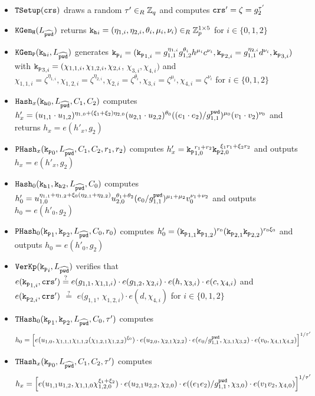 \begin{itemize}
	\item $\mathtt{TSetup}(\mathtt{crs})$ draws a random $\tau'\in_R\mathbb{Z}_q$ and computes $\mathtt{crs}'=\zeta=g_2^{\tau'}$
	
	\item $\mathtt{KGen_H}(L_{\widehat{\mathtt{pwd}}})$ returns $\mathtt{k_h}_i=(\eta_{1,i},\eta_{2,i},\theta_i,\mu_i,\nu_i)\in_R\mathbb{Z}_p^{1\times 5}$ for $i\in\{0,1,2\}$
	
  \item $\mathtt{KGen_P}(\mathtt{k_h}_i, L_{\widehat{\mathtt{pwd}}})$ generates 
      $\mathtt{k_p}_i=(\mathtt{k_p}_{1,i}=g_{1,1}^{\eta_{1,i}} g_{1,2}^{\theta_i} h^{\mu_i} c^{\nu_i}, \mathtt{k_p}_{2,i}=g_{1,1}^{\eta_{2,i}} d^{\nu_i}, \mathtt{k_p}_{3,i})$ with
      $\mathtt{k_p}_{3,i}=(\chi_{1,1,i}, \chi_{1,2,i}, \chi_{2,i}$, $\chi_{3,i}, \chi_{4,i})$ and 
      $\chi_{1,1,i}={\zeta}^{\eta_{1,i}}, \chi_{1,2,i}={\zeta}^{\eta_{2,i}}, \chi_{2,i}={\zeta}^{\theta_i}, \chi_{3,i}={\zeta}^{\mu_i}, \chi_{4,i}={\zeta}^{\nu_i}$ for $i\in\{0,1,2\}$
  
  \item $\mathtt{Hash}_x(\mathtt{k_h}_0, L_{\widehat{\mathtt{pwd}}}, C_1, C_2)$ computes 
      $h'_x=(u_{1,1}\cdot u_{1,2})^{\eta_{1,0}+(\xi_1+\xi_2)\eta_{2,0}} (u_{2,1}\cdot u_{2,2})^{\theta_0} ((e_1\cdot e_2)/g_{1,1}^{\mathtt{pwd}})^{\mu_0} (v_1\cdot v_2)^{\nu_0}$
      and returns $h_x=e(h'_x,g_2)$
  \item $\mathtt{PHash}_x(\mathtt{k_p}_0, L_{\widehat{\mathtt{pwd}}}, C_1, C_2, r_1, r_2)$ computes 
      $h'_x=\mathtt{k_p}_{1,0}^{r_1+r_2} \mathtt{k_p}_{2,0}^{\xi_1 r_1+\xi_2 r_2}$
      and outputs $h_x=e(h'_x,g_2)$
  \item $\mathtt{Hash}_0(\mathtt{k_h}_1, \mathtt{k_h}_2, L_{\widehat{\mathtt{pwd}}}, C_0)$ computes 
      $h'_0=u_{1,0}^{\eta_{1,1}+\eta_{1,2}+\xi_0(\eta_{2,1}+\eta_{2,2})} u_{2,0}^{\theta_1+\theta_2} (e_0/g_{1,1}^{\mathtt{pwd}})^{\mu_1+\mu_2} v_0^{\nu_1+\nu_2}$
      and outputs $h_0=e(h'_0,g_2)$
  \item $\mathtt{PHash}_0(\mathtt{k_p}_1, \mathtt{k_p}_2, L_{\widehat{\mathtt{pwd}}}, C_0, r_0)$ computes $h'_0=(\mathtt{k_p}_{1,1}\mathtt{k_p}_{1,2})^{r_0} (\mathtt{k_p}_{2,1}\mathtt{k_p}_{2,2})^{r_0\xi_0}$
      and outputs $h_0=e(h'_0,g_2)$
	
  \item $\mathtt{VerKp}(\mathtt{k_p}_i, L_{\widehat{\mathtt{pwd}}})$ verifies that 
      $e(\mathtt{k_p}_{1,i}, \mathtt{crs}')\stackrel{?}{=} e(g_{1,1}, \chi_{1,1,i})\cdot e(g_{1,2}, \chi_{2,i})\cdot e(h, \chi_{3,i})\cdot e(c, \chi_{4,i})$ and
      $e(\mathtt{k_p}_{2,i}, \mathtt{crs}')$ $\stackrel{?}{=}$ $e(g_{1,1}$, $\chi_{1,2,i})\cdot e(d, \chi_{4,i})$ for $i\in\{0,1,2\}$

  \item $\mathtt{THash}_0(\mathtt{k_p}_1, \mathtt{k_p}_2, L_{\widehat{\mathtt{pwd}}}, C_0, \tau')$ computes 
      \[h_0=\left[ e(u_{1,0}, \chi_{1,1,1}\chi_{1,1,2}(\chi_{1,2,1}\chi_{1,2,2})^{\xi_0})\cdot e(u_{2,0}, \chi_{2,1}\chi_{2,2})\cdot e(e_0/g_{1,1}^{\mathtt{pwd}}, \chi_{3,1}\chi_{3,2})\cdot e(v_0, \chi_{4,1}\chi_{4,2}) \right]^{1/\tau'}\]
			
	\item $\mathtt{THash}_x(\mathtt{k_p}_0, L_{\widehat{\mathtt{pwd}}}, C_1, C_2,\tau')$ computes 
    	\[h_x=\left[ e(u_{1,1} u_{1,2}, \chi_{1,1,0}\chi_{1,2,0}^{\xi_1+\xi_2}) \cdot e(u_{2,1} u_{2,2}, \chi_{2,0}) \cdot e( (e_1 e_2) / g_{1,1}^{\mathtt{pwd}}, \chi_{3,0}) \cdot e( v_{1} v_2, \chi_{4,0})\right]^{1/\tau'}\]
\end{itemize}

